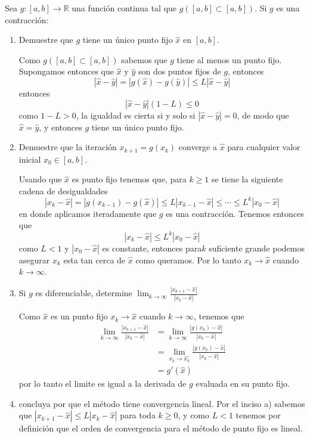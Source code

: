 \vspace{1cm}
\begin{problema}
Sea \(g:[a,b]\to\mathbb{R}\) una función continua tal que \(g([a,b]\subset[a,b])\). Si \(g\) es una contracción:

\vspace{1cm}
\begin{enumerate}[label=\alph*)]
    \item Demuestre que \(g\) tiene un único punto fijo \(\hat{x}\) en \([a,b]\).
    
    Como \(g([a,b]\subset[a,b])\) sabemos que \(g\) tiene al menos un punto fijo. Supongamos entonces que \(\hat{x}\) y \(\hat{y}\) son dos puntos fijos de \(g\), entonces \[|\hat{x}-\hat{y}|=|g(\hat{x})-g(\hat{y})|\le L|\hat{x}-\hat{y}|\] entonces \[|\hat{x}-\hat{y}|(1-L)\le0\] como \(1-L>0\), la igualdad es cierta si y solo si \(|\hat{x}-\hat{y}|=0\), de modo que \(\hat{x}=\hat{y}\), y entonces \(g\) tiene un único punto fijo.

    \item Demuestre que la iteración \(x_{k+1}=g(x_k)\) converge a \(\hat{x}\) para cualquier valor inicial \(x_0\in[a,b]\).
    
    Usando que \(\hat{x}\) es punto fijo tenemos que, para \(k\ge1\) se tiene la siguiente cadena de desigualdades \[|x_{k}-\hat{x}|=|g(x_{k-1})-g(\hat{x})|\le L|x_{k-1}-\hat{x}|\le\cdots\le L^k|x_0-\hat{x}|\] en donde aplicamos iteradamente que \(g\) es una contracción. Tenemos entonces que \[|x_k-\hat{x}|\le L^k|x_0-\hat{x}|\] como \(L<1\) y \(|x_0-\hat{x}|\) es constante, entonces para\(k\) suficiente grande podemos asegurar \(x_k\) esta tan cerca de \(\hat{x}\) como queramos. Por lo tanto \(x_k\to\hat{x}\) cuando \(k\to\infty\).

    \item Si \(g\) es diferenciable, determine \(\lim_{k\to\infty}\frac{|x_{k+1}-\hat{x}|}{|x_k-\hat{x}|}\) 
    
    Como \(\hat{x}\) es un punto fijo \(x_k\to\hat{x}\) cuando \(k\to\infty\), tenemos que 
    \begin{align*}
        \lim_{k\to\infty}\frac{|x_{k+1}-\hat{x}|}{|x_k-\hat{x}|}&=\lim_{k\to\infty}\frac{|g(x_k)-\hat{x}|}{|x_k-\hat{x}|}\\[1em]
        &=\lim_{x_k\to\hat{x_k}}\frac{|g(x_k)-\hat{x}|}{|x_k-\hat{x}|}\\[1em]
        &=g'(\hat{x})
    \end{align*}    
    por lo tanto el limite es igual a la derivada de \(g\) evaluada en su punto fijo.

    \item concluya por que el método tiene convergencia lineal.
    Por el inciso a) sabemos que \(|x_{k+1}-\hat{x}|\le L|x_k-\hat{x}|\) para toda \(k\ge0\), y como \(L<1\) tenemos por definición que el orden de convergencia para el método de punto fijo es lineal.

    
\end{enumerate}

\end{problema}